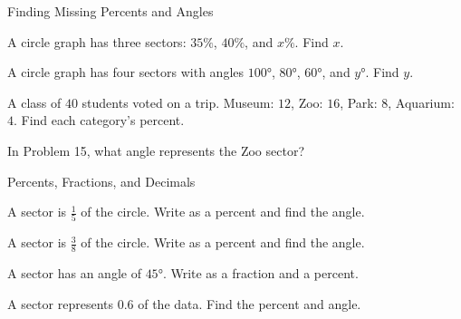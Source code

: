 \begin{practiceBox}[funTeal]{Finding Missing Percents and Angles}

\prob A circle graph has three sectors: $35\%$, $40\%$, and $x\%$. Find $x$. \answerBlank[3cm]

\prob A circle graph has four sectors with angles $100°$, $80°$, $60°$, and $y°$. Find $y$. \answerBlank[3cm]

\prob A class of $40$ students voted on a trip. Museum: $12$, Zoo: $16$, Park: $8$, Aquarium: $4$. Find each category's percent.

\prob In Problem 15, what angle represents the Zoo sector? \answerBlank[3cm]

\end{practiceBox}

\begin{practiceBox}[funOrange]{Percents, Fractions, and Decimals}


\prob A sector is $\frac{1}{5}$ of the circle. Write as a percent and find the angle. \answerBlank[3cm]

\prob A sector is $\frac{3}{8}$ of the circle. Write as a percent and find the angle. \answerBlank[3cm]

\prob A sector has an angle of $45°$. Write as a fraction and a percent. \answerBlank[3cm]

\prob A sector represents $0.6$ of the data. Find the percent and angle. \answerBlank[3cm]

\end{practiceBox}

